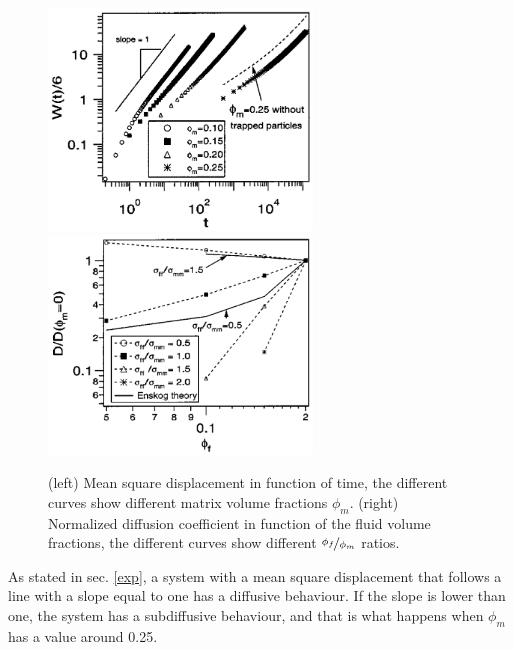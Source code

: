 \documentclass[a4paper,12pt]{article}
\begin{document}
\begin{figure}[htbp]
\centering
\subfigure
{\includegraphics[width=7cm]{pics/msd_mm.png}}
\subfigure
{\includegraphics[width=7cm]{pics/ndc_mm.png}}
\caption{(left) Mean square displacement in function of time, the different curves show different matrix volume fractions $\phi_m$. (right) Normalized diffusion coefficient in function of the fluid volume fractions, the different curves show different $\nicefrac{\phi_f}{\phi_m}$ ratios.}
\label{msd ndc mm}
\end{figure}

As stated in sec. \ref{exp}, a system with a mean square displacement that follows a line with a slope equal to one has a diffusive behaviour. If the slope is lower than one, the system has a subdiffusive behaviour, and that is what happens when $\phi_m$ has a value around 0.25.\\
\end{document}
